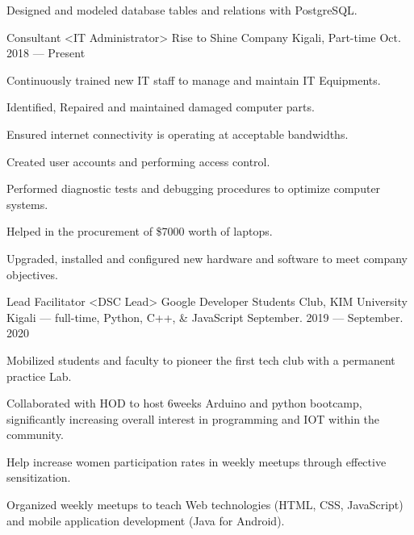 \begin{cventries}
{\begin{cvitems}
        \item {Designed and modeled database tables and relations with PostgreSQL.}
      \end{cvitems}
    }
  \cventry
    {Consultant <IT Administrator>}
    {Rise to Shine Company}
    {Kigali, Part-time}
    {Oct. 2018 --- Present}
    {
      \begin{cvitems}
        \item {Continuously trained new IT staff to manage and maintain IT Equipments.}
        \item {Identified, Repaired and maintained damaged computer parts.}
        \item {Ensured internet connectivity is operating at acceptable bandwidths.}
        \item {Created user accounts and performing access control.}
        \item {Performed diagnostic tests and debugging procedures to optimize computer systems.}
        \item {Helped in the procurement of \$7000 worth of laptops.}
        \item {Upgraded, installed and configured new hardware and software to meet company objectives.}
      \end{cvitems}
    }
  \cventry
    {Lead Facilitator <DSC Lead>}
    {Google Developer Students Club, KIM University}
    {Kigali --- full-time, Python, C++, \& JavaScript}
    {September. 2019 --- September. 2020}
    {
      \begin{cvitems}
        \item{Mobilized students and faculty to pioneer the first tech club with a permanent practice Lab.}
        \item {Collaborated with HOD to host 6weeks Arduino and python bootcamp, significantly increasing overall interest in programming and IOT within the community.}
        \item {Help increase women participation rates in weekly meetups through effective sensitization.}
        \item {Organized weekly meetups to teach Web technologies (HTML, CSS, JavaScript) and mobile application development (Java for Android).}
      \end{cvitems}
    }
  \end{cventries}
